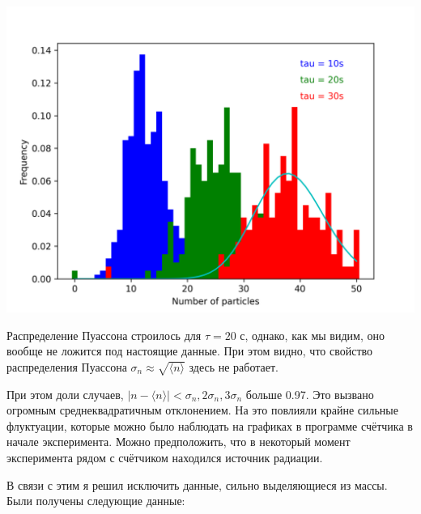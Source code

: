 \documentclass[12pt, a4paper]{article}
\begin{document}
\begin{center}
    \includegraphics[width=\textwidth]{Figure bad}
\end{center}

Распределение Пуассона строилось для $\tau = 20$ с, однако, как мы видим,
оно вообще не ложится под настоящие данные.
При этом видно, что свойство распределения Пуассона
$\sigma_n \approx \sqrt{\langle n \rangle}$ здесь не работает.


При этом доли случаев, $|n - \langle n \rangle| < \sigma_n, 2\sigma_n,
3\sigma_n$ больше 0.97. Это вызвано огромным среднеквадратичным отклонением.
На это повлияли крайне сильные флуктуации, которые можно было наблюдать
на графиках в программе счётчика в начале эксперимента. Можно предположить,
что в некоторый момент эксперимента рядом с счётчиком находился источник
радиации.


В связи с этим я решил исключить данные, сильно выделяющиеся из массы.
Были получены следующие данные:
\end{document}
